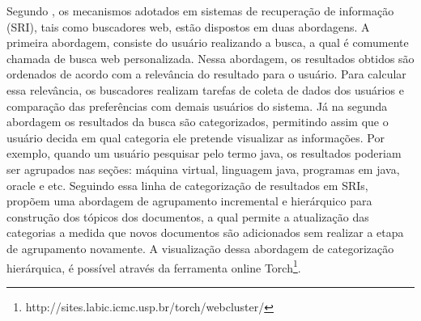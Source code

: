 Segundo , os mecanismos adotados em sistemas de recuperação de informação
(SRI), tais como buscadores web, estão dispostos em duas abordagens. A primeira abordagem, consiste
do usuário realizando a busca, a qual é comumente chamada de busca web personalizada.  Nessa
abordagem, os resultados obtidos são ordenados de acordo com a relevância do resultado para o
usuário. Para calcular essa relevância, os buscadores realizam tarefas de coleta de dados dos
usuários e comparação das preferências com demais usuários do sistema. Já na segunda abordagem os
resultados da busca são categorizados, permitindo assim que o usuário decida em qual categoria ele
pretende visualizar as informações. Por exemplo, quando um usuário pesquisar pelo termo java, os
resultados poderiam ser agrupados nas seções: máquina virtual, linguagem java, programas em java,
oracle e etc.  Seguindo essa linha de categorização de resultados em SRIs, 
propõem uma abordagem de agrupamento incremental e hierárquico para construção dos tópicos dos
documentos, a qual permite a atualização das categorias a medida que novos documentos são
adicionados sem realizar a etapa de agrupamento novamente. A visualização dessa abordagem de
categorização hierárquica, é possível através da ferramenta online
Torch\footnote{http://sites.labic.icmc.usp.br/torch/webcluster/}.

